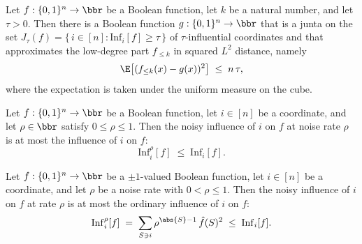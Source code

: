 \begin{lemma}
\label{KKL.lowDegreePart_depends_on_influential}
\leanok
{}
Let $f:\{0,1\}^n\to\bbr$ be a Boolean function, let $k$ be a natural number, and let
$\tau>0$. Then there is a Boolean function $g:\{0,1\}^n\to\bbr$ that is a junta on the
set $J_\tau(f)=\{\,i\in[n]:\mathrm{Inf}_i[f]\ge\tau\,\}$ of $\tau$-influential
coordinates and that approximates the low-degree part $f_{\le k}$ in squared $L^2$
distance, namely
\[
  \E\big[(f_{\le k}(x)-g(x))^2\big]\;\le\;n\,\tau,
\]
where the expectation is taken under the uniform measure on the cube.
\end{lemma}

\begin{lemma}
\label{KKL.noisyInfluence_le_influence}
\leanok
{}
Let $f:\{0,1\}^n\to\bbr$ be a Boolean function, let $i\in[n]$ be a coordinate, and let
$\rho\in\bbr$ satisfy $0\le\rho\le 1$. Then the noisy influence of $i$ on $f$ at noise
rate $\rho$ is at most the influence of $i$ on $f$:
\[
  \mathrm{Inf}_i^{\rho}[f]\;\le\;\mathrm{Inf}_i[f].
\]
\end{lemma}

\begin{lemma}
\label{KKL.noisyInfluence_power_bound}
\leanok
{}
Let $f:\{0,1\}^n\to\bbr$ be a $\pm 1$-valued Boolean function, let $i\in[n]$ be a
coordinate, and let $\rho$ be a noise rate with $0<\rho\le 1$. Then the noisy influence
of $i$ on $f$ at rate $\rho$ is at most the ordinary influence of $i$ on $f$:
\[
\mathrm{Inf}_i^{\rho}[f]\;=\;\sum_{S\ni i}\rho^{\abs{S}-1}\,\hat
f(S)^2\;\le\;\mathrm{Inf}_i[f].
\]
\end{lemma}


